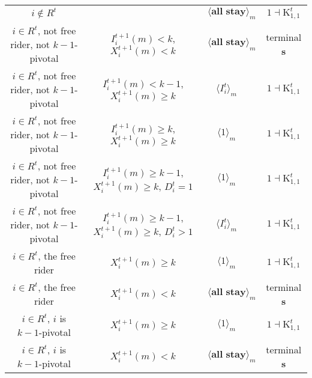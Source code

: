 \documentclass[12pt,letter]{article}
\newcommand{\Kappa}{\mathrm{K}}
\theoremstyle{definition}
\theoremstyle{remark}
\theoremstyle{claim}
\begin{document}
\begin{landscape}
\begin{table}[!htbp]
\begin{center}
\begin{tabular}{c c | c | c | c}
\hline
\hline
$i\notin R^t$  	& 								& $\langle \textbf{all stay} \rangle_m$		&  			& $1\dashv \Kappa^t_{1,1}$ \\
$i\in R^t$, not free rider, not $k-1$-pivotal		 	&  $I^{t+1}_i(m)< k$, $X^{t+1}_i(m)<k$			&  $\langle \textbf{all stay} \rangle_m$	& 	& terminal \textbf{s} \\
$i\in R^t$, not free rider, not $k-1$-pivotal	  	& $I^{t+1}_i(m)<k-1$, $X^{t+1}_i(m)\geq k$		    & $\langle I^t_i \rangle_m$ 		&    			& $1\dashv \Kappa^t_{1,1}$ \\
$i\in R^t$, not free rider, not $k-1$-pivotal	 	&  $I^{t+1}_i(m)\geq k$, $X^{t+1}_i(m)\geq k$	& $\langle 1 \rangle_m$ 	& 	& $1\dashv \Kappa^t_{1,1}$ \\
$i\in R^t$, not free rider, not $k-1$-pivotal	 	&  $I^{t+1}_i(m)\geq k-1$, $X^{t+1}_i(m)\geq k$, $D^t_i=1$	& $\langle 1 \rangle_m$ 	& 	& $1\dashv \Kappa^t_{1,1}$ \\
$i\in R^t$, not free rider, not $k-1$-pivotal	 	&  $I^{t+1}_i(m)\geq k-1$, $X^{t+1}_i(m)\geq k$, $D^t_i>1$	& $\langle I^t_i \rangle_m$ 	& 	& $1\dashv \Kappa^t_{1,1}$ \\
$i\in R^t$, the free rider  	&  $X^{t+1}_i(m)\geq k$ & $\langle 1 \rangle_m$ 		& 				  & $1\dashv \Kappa^t_{1,1}$ \\
$i\in R^t$, the free rider  	&  		$X^{t+1}_i(m)<k$					&  $\langle \textbf{all stay} \rangle_m$		& 										  & terminal \textbf{s} \\
$i\in R^t$, $i$ is $k-1$-pivotal  	&  $X^{t+1}_i(m)\geq k$ & $\langle 1 \rangle_m$ 	& 											 & $1\dashv \Kappa^t_{1,1}$ \\
$i\in R^t$, $i$ is $k-1$-pivotal  	&  	$X^{t+1}_i(m)<k$		&  $\langle \textbf{all stay} \rangle_m$	& 											 & terminal \textbf{s} \\
\hline
\end{tabular}
\end{center}
\end{table}


\end{landscape}




\clearpage
\end{document}
